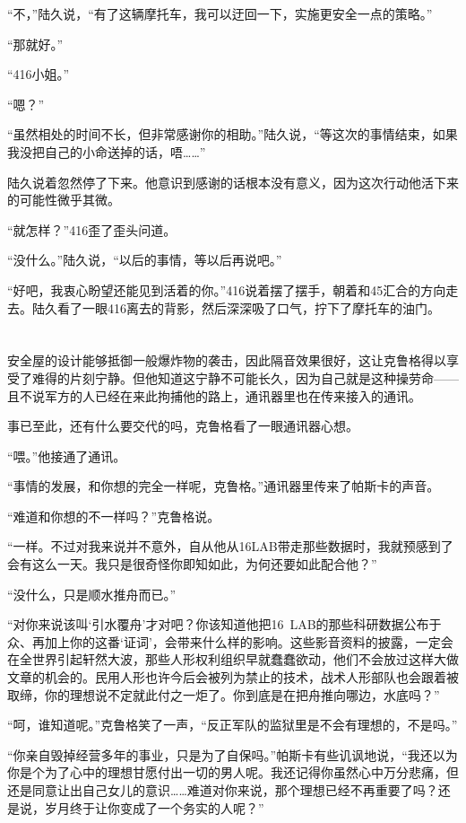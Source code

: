 “不，”陆久说，“有了这辆摩托车，我可以迂回一下，实施更安全一点的策略。”

“那就好。”

“416小姐。”

“嗯？”

“虽然相处的时间不长，但非常感谢你的相助。”陆久说，“等这次的事情结束，如果我没把自己的小命送掉的话，唔……”

陆久说着忽然停了下来。他意识到感谢的话根本没有意义，因为这次行动他活下来的可能性微乎其微。

“就怎样？”416歪了歪头问道。

“没什么。”陆久说，“以后的事情，等以后再说吧。”

“好吧，我衷心盼望还能见到活着的你。”416说着摆了摆手，朝着和45汇合的方向走去。陆久看了一眼416离去的背影，然后深深吸了口气，拧下了摩托车的油门。

\section*{}

安全屋的设计能够抵御一般爆炸物的袭击，因此隔音效果很好，这让克鲁格得以享受了难得的片刻宁静。但他知道这宁静不可能长久，因为自己就是这种操劳命——且不说军方的人已经在来此拘捕他的路上，通讯器里也在传来接入的通讯。

事已至此，还有什么要交代的吗，克鲁格看了一眼通讯器心想。

“喂。”他接通了通讯。

“事情的发展，和你想的完全一样呢，克鲁格。”通讯器里传来了帕斯卡的声音。

“难道和你想的不一样吗？”克鲁格说。

“一样。不过对我来说并不意外，自从他从16LAB带走那些数据时，我就预感到了会有这么一天。我只是很奇怪你即知如此，为何还要如此配合他？”

“没什么，只是顺水推舟而已。”

“对你来说该叫‘引水覆舟’才对吧？你该知道他把16 LAB的那些科研数据公布于众、再加上你的这番‘证词’，会带来什么样的影响。这些影音资料的披露，一定会在全世界引起轩然大波，那些人形权利组织早就蠢蠢欲动，他们不会放过这样大做文章的机会的。民用人形也许今后会被列为禁止的技术，战术人形部队也会跟着被取缔，你的理想说不定就此付之一炬了。你到底是在把舟推向哪边，水底吗？”

“呵，谁知道呢。”克鲁格笑了一声，“反正军队的监狱里是不会有理想的，不是吗。”

“你亲自毁掉经营多年的事业，只是为了自保吗。”帕斯卡有些讥讽地说，“我还以为你是个为了心中的理想甘愿付出一切的男人呢。我还记得你虽然心中万分悲痛，但还是同意让出自己女儿的意识……难道对你来说，那个理想已经不再重要了吗？还是说，岁月终于让你变成了一个务实的人呢？”

